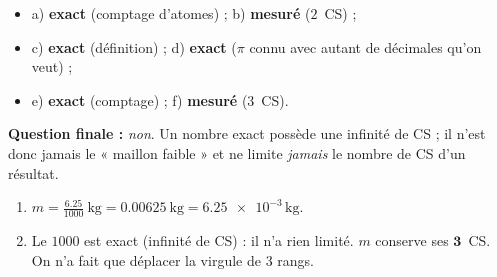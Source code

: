 \documentclass[11pt,a4paper]{article}
\begin{document}
\begin{cor}
\begin{itemize}[leftmargin=1.6em,itemsep=1pt]
  \item a) \textbf{exact} (comptage d'atomes) ; \quad b) \textbf{mesuré} ($2$~CS) ;
  \item c) \textbf{exact} (définition) ; \quad d) \textbf{exact} ($\pi$ connu avec autant de décimales
        qu'on veut) ;
  \item e) \textbf{exact} (comptage) ; \quad f) \textbf{mesuré} ($3$~CS).
\end{itemize}
\textbf{Question finale :} \emph{non}. Un nombre exact possède une infinité de CS ; il n'est donc
jamais le « maillon faible » et ne limite \emph{jamais} le nombre de CS d'un résultat.
\end{cor}

\begin{cor}
\begin{enumerate}[label=\alph*),leftmargin=1.6em,itemsep=1pt]
  \item $\displaystyle m=\frac{\num{6,25}}{\num{1000}}\ \si{\kilo\gram}=\qty{0,00625}{\kilo\gram}
        =\num{6,25e-3}\,\si{\kilo\gram}$.
  \item Le $\num{1000}$ est exact (infinité de CS) : il n'a rien limité. $m$ conserve ses
        $\mathbf{3}$~CS. On n'a fait que déplacer la virgule de $3$ rangs.
\end{enumerate}
\end{cor}
\end{document}
